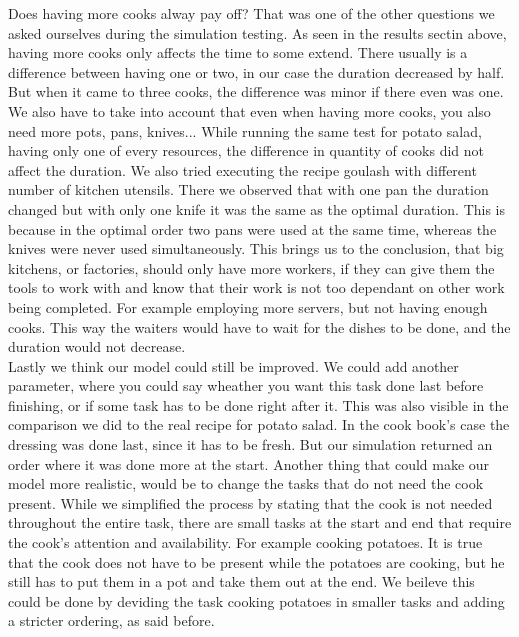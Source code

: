 Does having more cooks alway pay off? That was one of the other questions we asked ourselves during the simulation testing. As seen
in the results sectin above, having more cooks only affects the time to some extend. There usually is a difference between having one or two, 
in our case the duration decreased by half. But when it came to three cooks, the difference was minor if there even was one. 
We also have to take into account that even when having more cooks, you also need more pots, pans, knives... While running the same test for potato salad, 
having only one of every resources, the difference in quantity of cooks did not affect the duration. We also tried executing the recipe goulash
with different number of kitchen utensils. There we observed that with one pan the duration changed but with only one knife it was the same as the optimal duration.
This is because in the optimal order two pans were used at the same time, whereas the knives were never used simultaneously.  
This brings us to the conclusion, that big kitchens, or factories, should only have more workers, if they can give them the tools to work with and know that 
their work is not too dependant on other work being completed. For example employing more servers, but not having enough cooks. 
This way the waiters would have to wait for the dishes to be done, and the duration would not decrease. \\

Lastly we think our model could still be improved. We could add another parameter, 
where you could say wheather you want this task done last before finishing, or if some task has to be done right after it.
This was also visible in the comparison we did to the real recipe for potato salad. In the cook book's case 
the dressing was done last, since it has to be fresh. But our simulation returned an order where it was done more at the start.
Another thing that could make our model more realistic, would be to change the tasks that do not need the cook present. 
While we simplified the process by stating that the cook is not needed throughout the entire task, 
there are small tasks at the start and end that require the cook's attention and availability. For example cooking potatoes. 
It is true that the cook does not have to be present while the potatoes are cooking, but he still has to put them in a pot and take them out at the end.
We beileve this could be done by deviding the task cooking potatoes in smaller tasks and adding a stricter ordering, as said before.

